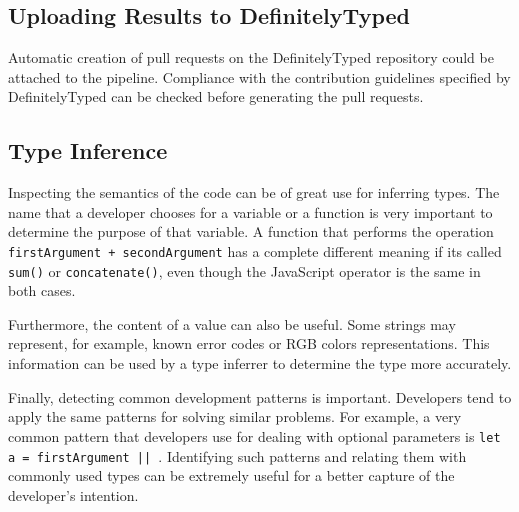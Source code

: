\subsection{Uploading Results to DefinitelyTyped}
Automatic creation of pull requests on the DefinitelyTyped repository could be attached to the pipeline. Compliance with the contribution guidelines specified by DefinitelyTyped can be checked before generating the pull requests.

\subsection{Type Inference}
Inspecting the semantics of the code can be of great use for inferring types. The name that a developer chooses for a variable or a function is very important to determine the purpose of that variable. A function that performs the operation \texttt{firstArgument + secondArgument} has a complete different meaning if its called \texttt{sum()} or \texttt{concatenate()}, even though the JavaScript operator is the same in both cases.

Furthermore, the content of a value can also be useful. Some strings may represent, for example, known error codes or RGB colors representations. This information can be used by a type inferrer to determine the type more accurately.

Finally, detecting common development patterns is important. Developers tend to apply the same patterns for solving similar problems. For example, a very common pattern that developers use for dealing with optional parameters is \texttt{let a = firstArgument || {}}. Identifying such patterns and relating them with commonly used types can be extremely useful for a better capture of the developer's intention.